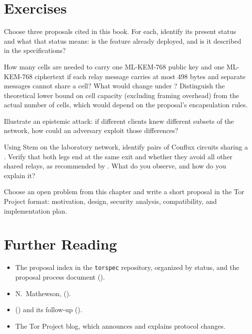 \section*{Exercises}

\begin{esercizio}[1]\label{es:31-stato}
Choose three proposals cited in this book. For each, identify its present status and what that status means: is the feature already deployed, and is it described in the specifications?
\end{esercizio}

\begin{esercizio}[1]\label{es:31-celle}
How many cells are needed to carry one ML-KEM-768 public key and one ML-KEM-768 ciphertext if each relay message carries at most 498 bytes and separate messages cannot share a cell? What would change under ? Distinguish the theoretical lower bound on cell capacity (excluding framing overhead) from the actual number of cells, which would depend on the proposal's encapsulation rules.
\end{esercizio}

\begin{esercizio}[2]\label{es:31-epistemico}
Illustrate an epistemic attack: if different clients knew different subsets of the network, how could an adversary exploit those differences?
\end{esercizio}

\begin{esercizio}[2]\label{es:31-conflux}
Using Stem on the laboratory network, identify pairs of Conflux circuits sharing a . Verify that both legs end at the same exit and whether they avoid all other shared relays, as recommended by . What do you observe, and how do you explain it?
\end{esercizio}

\begin{esercizio}[3]\label{es:31-proposta}
Choose an open problem from this chapter and write a short proposal in the Tor Project format: motivation, design, security analysis, compatibility, and implementation plan.
\end{esercizio}

\section*{Further Reading}
\begin{itemize}
  \item The proposal index in the \texttt{torspec} repository, organized by status, and the proposal process document ().
  \item N.~Mathewson,  ().
  \item {} () and its follow-up ().
  \item The Tor Project blog, which announces and explains protocol changes.
\end{itemize}
